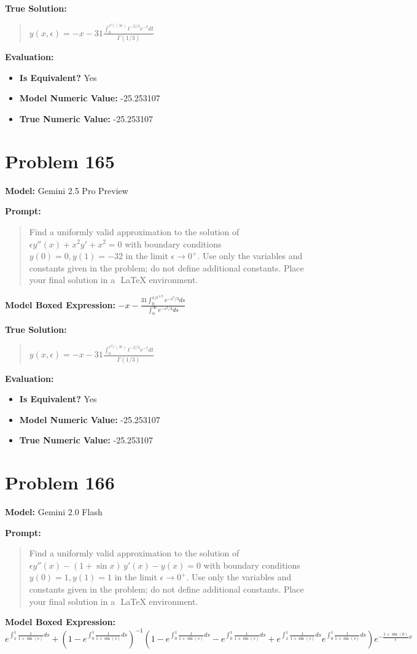 \documentclass{article}
\begin{document}
{\textbf{True Solution:}
\begin{quote}
$y(x,\epsilon) = -x - 31 \frac{\int_0^{x^3/(3\epsilon)} t^{-2/3} e^{-t} dt}{\Gamma(1/3)}$
\end{quote}

\textbf{Evaluation:}
\begin{itemize}
\item \textbf{Is Equivalent?} Yes
\item \textbf{Model Numeric Value:} -25.253107
\item \textbf{True Numeric Value:} -25.253107
\end{itemize}
\vspace{1cm}
\section*{Problem 165}
\textbf{Model:} Gemini 2.5 Pro Preview

\textbf{Prompt:}
\begin{quote}
Find a uniformly valid approximation to the solution of $\epsilon y''(x) + x^2y' + x^2 = 0$ with boundary conditions $y(0) = 0, y(1) = -32$ in the limit $\epsilon \to 0^+$. Use only the variables and constants given in the problem; do not define additional constants. Place your final solution in a $\boxed{}$ LaTeX environment.
\end{quote}
\textbf{Model Boxed Expression:} $-x - \frac{31 \int_0^{x/\epsilon^{1/3}} e^{-s^3/3} ds}{\int_0^\infty e^{-s^3/3} ds}$

\textbf{True Solution:}
\begin{quote}
$y(x,\epsilon) = -x - 31 \frac{\int_0^{x^3/(3\epsilon)} t^{-2/3} e^{-t} dt}{\Gamma(1/3)}$
\end{quote}

\textbf{Evaluation:}
\begin{itemize}
\item \textbf{Is Equivalent?} Yes
\item \textbf{Model Numeric Value:} -25.253107
\item \textbf{True Numeric Value:} -25.253107
\end{itemize}
\vspace{1cm}
\section*{Problem 166}
\textbf{Model:} Gemini 2.0 Flash

\textbf{Prompt:}
\begin{quote}
Find a uniformly valid approximation to the solution of $\epsilon y''(x) - (1 + \sin x)\, y'(x) - y(x) = 0$ with boundary conditions $y(0) = 1, y(1) = 1$ in the limit $\epsilon \to 0^+$. Use only the variables and constants given in the problem; do not define additional constants. Place your final solution in a $\boxed{}$ LaTeX environment.
\end{quote}
\textbf{Model Boxed Expression:} $e^{\int_x^1 \frac{1}{1+\sin(s)} ds} + (1-e^{\int_0^1 \frac{1}{1+\sin(s)} ds})^{-1} \left( 1 - e^{\int_0^1 \frac{1}{1+\sin(s)} ds} - e^{\int_0^x \frac{1}{1+\sin(s)} ds} + e^{\int_x^1 \frac{1}{1+\sin(s)} ds} e^{\int_0^1 \frac{1}{1+\sin(s)} ds} \right) e^{-\frac{1+\sin(0)}{\epsilon}x}$

}
\end{document}
